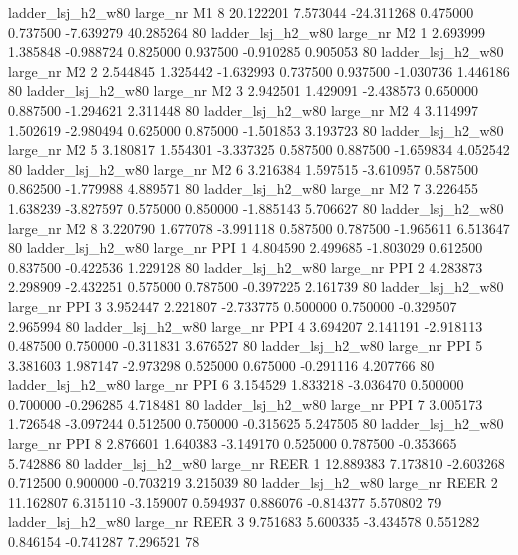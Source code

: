   ladder_lsj_h2_w80   large_nr       M1                 8 20.122201  7.573044 -24.311268 0.475000 0.737500 -7.639279   40.285264 80
  ladder_lsj_h2_w80   large_nr       M2                 1  2.693999  1.385848  -0.988724 0.825000 0.937500 -0.910285    0.905053 80
  ladder_lsj_h2_w80   large_nr       M2                 2  2.544845  1.325442  -1.632993 0.737500 0.937500 -1.030736    1.446186 80
  ladder_lsj_h2_w80   large_nr       M2                 3  2.942501  1.429091  -2.438573 0.650000 0.887500 -1.294621    2.311448 80
  ladder_lsj_h2_w80   large_nr       M2                 4  3.114997  1.502619  -2.980494 0.625000 0.875000 -1.501853    3.193723 80
  ladder_lsj_h2_w80   large_nr       M2                 5  3.180817  1.554301  -3.337325 0.587500 0.887500 -1.659834    4.052542 80
  ladder_lsj_h2_w80   large_nr       M2                 6  3.216384  1.597515  -3.610957 0.587500 0.862500 -1.779988    4.889571 80
  ladder_lsj_h2_w80   large_nr       M2                 7  3.226455  1.638239  -3.827597 0.575000 0.850000 -1.885143    5.706627 80
  ladder_lsj_h2_w80   large_nr       M2                 8  3.220790  1.677078  -3.991118 0.587500 0.787500 -1.965611    6.513647 80
  ladder_lsj_h2_w80   large_nr      PPI                 1  4.804590  2.499685  -1.803029 0.612500 0.837500 -0.422536    1.229128 80
  ladder_lsj_h2_w80   large_nr      PPI                 2  4.283873  2.298909  -2.432251 0.575000 0.787500 -0.397225    2.161739 80
  ladder_lsj_h2_w80   large_nr      PPI                 3  3.952447  2.221807  -2.733775 0.500000 0.750000 -0.329507    2.965994 80
  ladder_lsj_h2_w80   large_nr      PPI                 4  3.694207  2.141191  -2.918113 0.487500 0.750000 -0.311831    3.676527 80
  ladder_lsj_h2_w80   large_nr      PPI                 5  3.381603  1.987147  -2.973298 0.525000 0.675000 -0.291116    4.207766 80
  ladder_lsj_h2_w80   large_nr      PPI                 6  3.154529  1.833218  -3.036470 0.500000 0.700000 -0.296285    4.718481 80
  ladder_lsj_h2_w80   large_nr      PPI                 7  3.005173  1.726548  -3.097244 0.512500 0.750000 -0.315625    5.247505 80
  ladder_lsj_h2_w80   large_nr      PPI                 8  2.876601  1.640383  -3.149170 0.525000 0.787500 -0.353665    5.742886 80
  ladder_lsj_h2_w80   large_nr     REER                 1 12.889383  7.173810  -2.603268 0.712500 0.900000 -0.703219    3.215039 80
  ladder_lsj_h2_w80   large_nr     REER                 2 11.162807  6.315110  -3.159007 0.594937 0.886076 -0.814377    5.570802 79
  ladder_lsj_h2_w80   large_nr     REER                 3  9.751683  5.600335  -3.434578 0.551282 0.846154 -0.741287    7.296521 78
